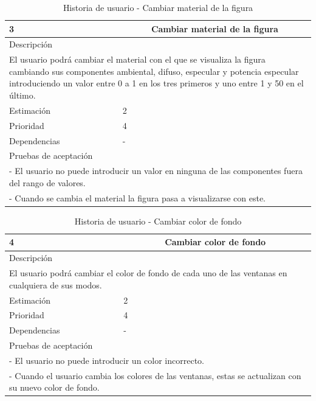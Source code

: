 \begin{table}[H]
	\begin{center}
		\begin{tabular} {|l|c|l|}
			\hline
			3 & \multicolumn{2}{c|}{Cambiar material de la figura} \\ \hline \hline
			\multicolumn{3}{|l|}{Descripción} \\ \hline
			\multicolumn{3}{|p{12cm}|}{El usuario podrá cambiar el material con el que se visualiza la figura cambiando sus componentes ambiental, difuso, especular y potencia especular introduciendo un valor entre 0 a 1 en los tres primeros y uno entre 1 y 50 en el último.} \\ \hline
			\multicolumn{2}{|l|}{Estimación} & 2 \\ \hline
			\multicolumn{2}{|l|}{Prioridad} & 4 \\ \hline
			\multicolumn{2}{|l|}{Dependencias} & - \\ \hline
			\multicolumn{3}{|l|}{Pruebas de aceptación} \\ \hline
			\multicolumn{3}{|p{12cm}|}{ - El usuario no puede introducir un valor en ninguna de las componentes fuera del rango de valores.} \\
			\multicolumn{3}{|p{12cm}|}{ - Cuando se cambia el material la figura pasa a visualizarse con este.} \\ \hline
		\end{tabular}
	\end{center}
	\caption{Historia de usuario - Cambiar material de la figura}
	\label{tab:hu_cambiar_material_de_la_figura}
\end{table}

\begin{table}[H]
	\begin{center}
		\begin{tabular} {|l|c|l|}
			\hline
			4 & \multicolumn{2}{c|}{Cambiar color de fondo} \\ \hline \hline
			\multicolumn{3}{|l|}{Descripción} \\ \hline
			\multicolumn{3}{|p{12cm}|}{El usuario podrá cambiar el color de fondo de cada uno de las ventanas en cualquiera de sus modos.} \\ \hline
			\multicolumn{2}{|l|}{Estimación} & 2 \\ \hline
			\multicolumn{2}{|l|}{Prioridad} & 4 \\ \hline
			\multicolumn{2}{|l|}{Dependencias} & - \\ \hline
			\multicolumn{3}{|l|}{Pruebas de aceptación} \\ \hline
			\multicolumn{3}{|p{12cm}|}{ - El usuario no puede introducir un color incorrecto.} \\
			\multicolumn{3}{|p{12cm}|}{ - Cuando el usuario cambia los colores de las ventanas, estas se actualizan con su nuevo color de fondo.} \\ \hline
		\end{tabular}
	\end{center}
	\caption{Historia de usuario - Cambiar color de fondo}
	\label{tab:hu_cambiar_color_de_fondo}
\end{table}

